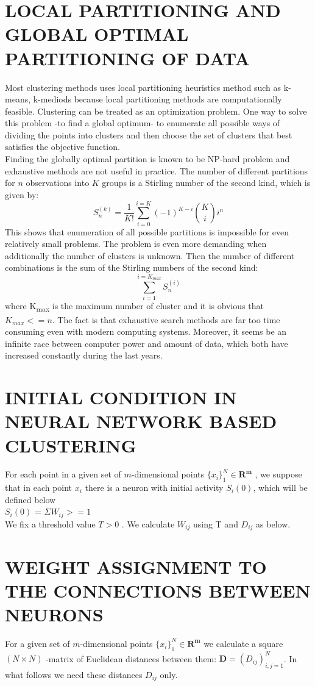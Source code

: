 \documentclass[letterpaper, 10 pt, conference]{ieeeconf}  %
\begin{document}
\section{LOCAL PARTITIONING AND GLOBAL OPTIMAL PARTITIONING OF DATA}
Most clustering methods uses local partitioning heuristics method such as k-means, k-mediods because local partitioning methods are computationally feasible. Clustering can be treated as an optimization problem. One way to solve this problem -to find a global optimum- to enumerate all possible ways of dividing the points into clusters and then choose the set of clusters that best satisfies the objective function.\\
Finding the globally optimal partition is known to be NP-hard problem and exhaustive methods are not useful in practice. The number of different partitions for $n$ observations into $K$ groups is a Stirling number of the
second kind, which is given by:\\
\[ S_n^{(k)} = \frac{1}{K!}\sum_{i=0}^{i=K}\left(-1\right)^{K-i}\binom{K}{i}i^n
\]
This shows that enumeration of all possible partitions is impossible for even relatively small problems. The problem is even more demanding when additionally the number of clusters is unknown. Then the number of different combinations is the sum of the Stirling numbers of the second kind:\\
\[
\sum_{i=1}^{i=K_{max}}S_n^{(i)}
\]
where K\textsubscript{max} is the maximum number of cluster and it is obvious that $K_{max}<=n$. The fact is that exhaustive search methods are far too time consuming even with modern computing systems. Moreover, it seems be an infinite race between computer power and amount of data, which both have increased constantly during the last years.

\section{INITIAL CONDITION IN NEURAL NETWORK BASED CLUSTERING}
For  each point in a given set of $m$-dimensional points $\{x_i\}_1^N\in \textbf{R}^\textbf{m}$ , we suppose that in each point $x_i$ there is a neuron with initial activity $S_i\left(0\right)$, which will be defined below\\
$S_i\left(0\right)$ = $\Sigma  W_{ij} >=1$ \\
We fix a threshold value $T > 0$ . We calculate $W_{ij}$ using T and $D_{ij}$ as below.


\section{WEIGHT ASSIGNMENT TO THE CONNECTIONS BETWEEN NEURONS}
For a given set of $m$-dimensional points $\{x_i\}_1^N\in \textbf{R}^\textbf{m}$ we calculate a square $\left(N \times N\right)$ -matrix of Euclidean distances between them: $\textbf{D}=\left(D_{ij}\right)_{i,j=1}^N$. In what follows we need these distances $D_{ij}$ only.
\end{document}
